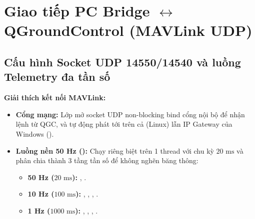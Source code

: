 \documentclass[11pt,a4paper]{article}
\begin{document}
\section{Giao tiếp PC Bridge $\leftrightarrow$ QGroundControl (MAVLink UDP)}

\subsection{Cấu hình Socket UDP 14550/14540 và luồng Telemetry đa tần số}
\noindent
\begin{minipage}[t]{0.45\textwidth}
\vspace{0pt}
\textbf{Giải thích kết nối MAVLink:}
\begin{itemize}
    \item \textbf{Cổng mạng:} Lớp  mở socket UDP non-blocking bind cổng nội bộ  để nhận lệnh từ QGC, và tự động phát tới  trên cả  (Linux) lẫn IP Gateway của Windows ().
    \item \textbf{Luồng nền 50 Hz ():} Chạy riêng biệt trên 1 thread với chu kỳ $20\text{ ms}$ và phân chia thành 3 tầng tần số để không nghẽn băng thông:
    \begin{itemize}
        \item \textbf{50 Hz ($20\text{ ms}$):} , .
        \item \textbf{10 Hz ($100\text{ ms}$):} , , , .
        \item \textbf{1 Hz ($1000\text{ ms}$):} , , , .
    \end{itemize}
\end{itemize}
\end{minipage}
\hfill
\end{document}
